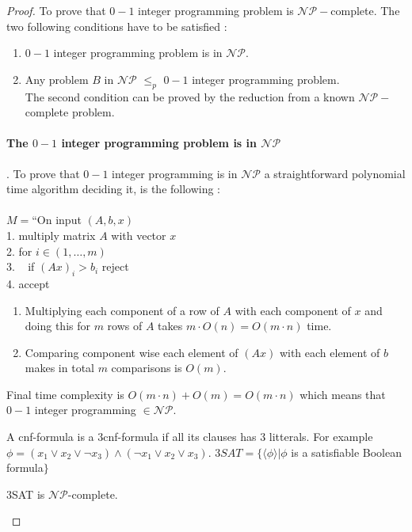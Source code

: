 \begin{proof}
To prove that $0-1$ integer programming problem is $\mathcal{NP}-$complete. The two following conditions have to be satisfied : 
\begin{enumerate}
    \item $0-1$ integer programming problem is in $\mathcal{NP}$.
    \item Any problem $B$ in $\mathcal{NP}$ $\leq_{p}$ $0-1$ integer programming
    problem.\\
    The second condition can be proved by the reduction from a known $\mathcal{NP-}$complete problem.
\end{enumerate}

\paragraph{The $0-1$ integer programming problem is in $\mathcal{NP}$}.  \hfill \break
To prove that $0-1$ integer programming is in $\mathcal{NP}$ a straightforward polynomial time algorithm deciding it, is the following :  \\ 
\\
$M = $``On input $(A, b, x)$\\
1. multiply matrix $A$ with vector $x$\\
2. for $i \in (1,\ldots,m)$\\
3. ~ if $(Ax)_i > b_i$ reject\\
4. accept 

\begin{enumerate}
    \item  Multiplying each component of a row of $A$ with each component of $x$ and doing this for $m$ rows of $A$ takes $m\cdot O(n) = O(m \cdot n )$ time. 
    \item  Comparing component wise each element of $(Ax)$ with each element of $b$ makes in total $m$ comparisons is $O(m)$. 
\end{enumerate}
Final time complexity is $O(m \cdot n) + O(m) = O(m \cdot n)$ which means that $0-1$ integer programming $\in \mathcal{NP}$.

\begin{defn}
A cnf-formula is a $3$cnf-formula if all its clauses has $3$ litterals. For example  
$\phi = (x_1 \vee x_2 \vee \neg x_3) \wedge (\neg x_1 \vee x_2 \vee x_3)$. $3SAT = \{\langle \phi \rangle | \phi$  is a satisfiable Boolean formula$\} $
\end{defn}

\begin{theorem}
$3$SAT is $\mathcal{NP}$-complete.
\end{theorem}


\end{proof}

